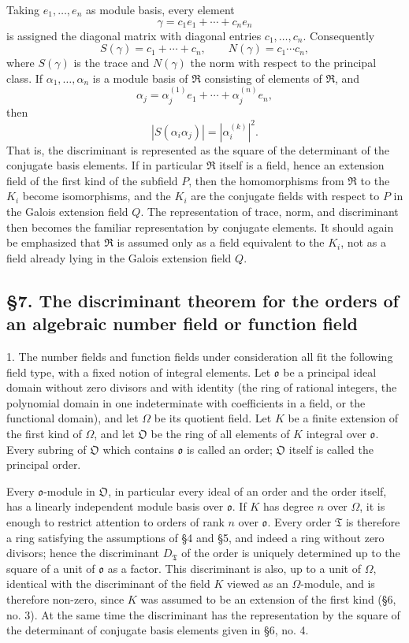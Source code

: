 \documentclass[11pt]{article}
\providecommand{\mR}{\mathfrak{R}}
\providecommand{\mT}{\mathfrak{T}}
\providecommand{\mO}{\mathfrak{O}}
\providecommand{\mo}{\mathfrak{o}}
\begin{document}
Taking $e_1,\ldots,e_n$ as module basis, every element
\[
        \gamma=c_1e_1+\cdots+c_ne_n
\]
is assigned the diagonal matrix with diagonal entries $c_1,\ldots,c_n$. Consequently
\[
        S(\gamma)=c_1+\cdots+c_n,
        \qquad
        N(\gamma)=c_1\cdots c_n,
\]
where $S(\gamma)$ is the trace and $N(\gamma)$ the norm with respect to the principal class. If $\alpha_1,\ldots,\alpha_n$ is a module basis of $\mR$ consisting of elements of $\mR$, and
\[
        \alpha_j=\alpha_j^{(1)}e_1+\cdots+\alpha_j^{(n)}e_n,
\]
then
\[
        |S(\alpha_i\alpha_j)|=
        \left|\alpha_i^{(k)}\right|^2.
\]
That is, the discriminant is represented as the square of the determinant of the conjugate basis elements. If in particular $\mR$ itself is a field, hence an extension field of the first kind of the subfield $P$, then the homomorphisms from $\mR$ to the $K_i$ become isomorphisms, and the $K_i$ are the conjugate fields with respect to $P$ in the Galois extension field $Q$. The representation of trace, norm, and discriminant then becomes the familiar representation by conjugate elements. It should again be emphasized that $\mR$ is assumed only as a field equivalent to the $K_i$, not as a field already lying in the Galois extension field $Q$.

\subsection*{§7. The discriminant theorem for the orders of an algebraic number field or function field}

1. The number fields and function fields under consideration all fit the following field type, with a fixed notion of integral elements. Let $\mo$ be a principal ideal domain without zero divisors and with identity (the ring of rational integers, the polynomial domain in one indeterminate with coefficients in a field, or the functional domain), and let $\Omega$ be its quotient field. Let $K$ be a finite extension of the first kind of $\Omega$, and let $\mO$ be the ring of all elements of $K$ integral over $\mo$. Every subring of $\mO$ which contains $\mo$ is called an order; $\mO$ itself is called the principal order.

Every $\mo$-module in $\mO$, in particular every ideal of an order and the order itself, has a linearly independent module basis over $\mo$. If $K$ has degree $n$ over $\Omega$, it is enough to restrict attention to orders of rank $n$ over $\mo$. Every order $\mT$ is therefore a ring satisfying the assumptions of §4 and §5, and indeed a ring without zero divisors; hence the discriminant $D_\mT$ of the order is uniquely determined up to the square of a unit of $\mo$ as a factor. This discriminant is also, up to a unit of $\Omega$, identical with the discriminant of the field $K$ viewed as an $\Omega$-module, and is therefore non-zero, since $K$ was assumed to be an extension of the first kind (§6, no. 3). At the same time the discriminant has the representation by the square of the determinant of conjugate basis elements given in §6, no. 4.
\end{document}

